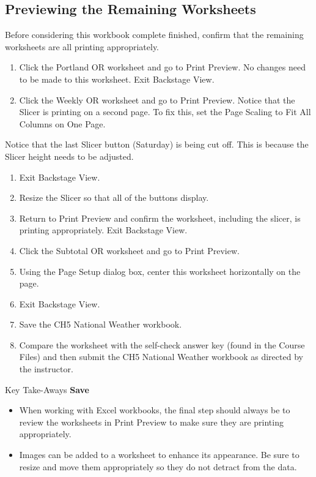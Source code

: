 \subsection{Previewing the Remaining Worksheets}

Before considering this workbook complete finished, confirm that the remaining worksheets are all printing appropriately.

\begin{enumerate}
	\item Click the Portland OR worksheet and go to Print Preview. No changes need to be made to this worksheet. Exit Backstage View.
	\item Click the Weekly OR worksheet and go to Print Preview. Notice that the Slicer is printing on a second page. To fix this, set the Page Scaling to Fit All Columns on One Page.
\end{enumerate}

Notice that the last Slicer button (Saturday) is being cut off. This is because the Slicer height needs to be adjusted.

\begin{enumerate}
	\item Exit Backstage View.
	\item Resize the Slicer so that all of the buttons display.
	\item Return to Print Preview and confirm the worksheet, including the slicer, is printing appropriately. Exit Backstage View.
	\item Click the Subtotal OR worksheet and go to Print Preview.
	\item Using the Page Setup dialog box, center this worksheet horizontally on the page. 
	\item Exit Backstage View.
	\item Save the CH5 National Weather workbook.
	\item Compare the worksheet with the self-check answer key (found in the Course Files) and then submit the CH5 National Weather workbook as directed by the instructor.
\end{enumerate}

\begin{center}
	\begin{tkwbox}{Key Take-Aways}
		\textbf{Save}
		\\
		\begin{itemize}
			\setlength{\itemsep}{0pt}
			\setlength{\parskip}{0pt}
			\setlength{\parsep}{0pt}

			\item When working with Excel workbooks, the final step should always be to review the worksheets in Print Preview to make sure they are printing appropriately.
			\item Images can be added to a worksheet to enhance its appearance. Be sure to resize and move them appropriately so they do not detract from the data.

		\end{itemize}
	\end{tkwbox}
\end{center}

